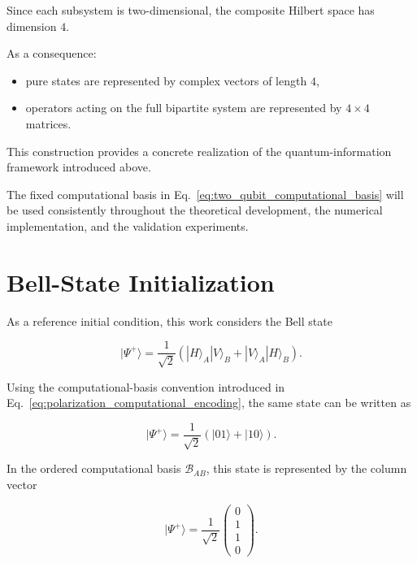 Since each subsystem is two-dimensional, the composite Hilbert space has dimension \(4\).

As a consequence:
\begin{itemize}
    \item pure states are represented by complex vectors of length \(4\),
    \item operators acting on the full bipartite system are represented by \(4 \times 4\) matrices.
\end{itemize}

\medskip

This construction provides a concrete realization of the quantum-information framework introduced above.

The fixed computational basis in Eq.~\eqref{eq:two_qubit_computational_basis} will be used consistently throughout the theoretical development, the numerical implementation, and the validation experiments.


\section{Bell-State Initialization}

As a reference initial condition, this work considers the Bell state

\begin{equation}
|\Psi^{+}\rangle
=
\frac{1}{\sqrt{2}}
\left(
|H\rangle_A |V\rangle_B
+
|V\rangle_A |H\rangle_B
\right).
\label{eq:bell_psi_plus_polarization}
\end{equation}

Using the computational-basis convention introduced in Eq.~\eqref{eq:polarization_computational_encoding}, the same state can be written as

\begin{equation}
|\Psi^{+}\rangle
=
\frac{1}{\sqrt{2}}
\left(
|01\rangle + |10\rangle
\right).
\label{eq:bell_psi_plus}
\end{equation}

\medskip

In the ordered computational basis \( \mathcal{B}_{AB} \), this state is represented by the column vector

\begin{equation}
|\Psi^{+}\rangle
=
\frac{1}{\sqrt{2}}
\begin{pmatrix}
0\\
1\\
1\\
0
\end{pmatrix}.
\label{eq:bell_psi_plus_vector}
\end{equation}

